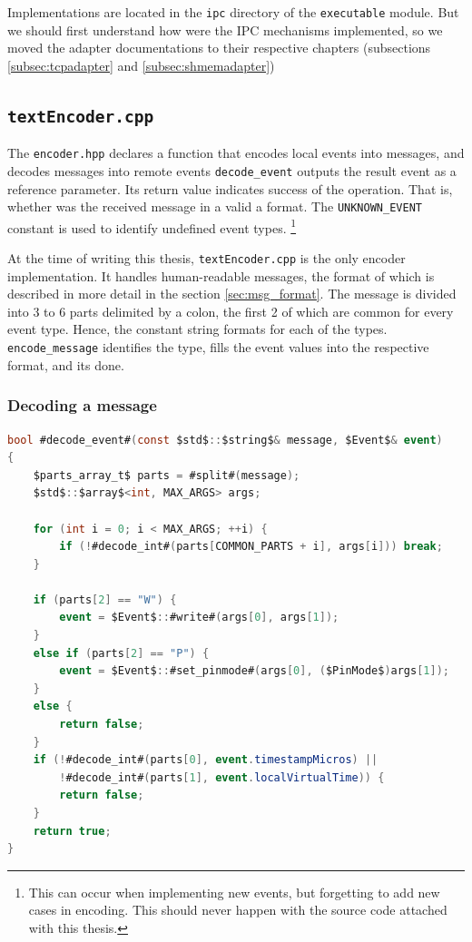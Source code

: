 Implementations are located in the \texttt{ipc} directory of the \texttt{executable} module. But we should first understand how were the IPC mechanisms implemented, so we moved the adapter documentations to their respective chapters (subsections \ref{subsec:tcpadapter} and \ref{subsec:shmemadapter})

\subsection{\texttt{textEncoder.cpp}}

The \texttt{encoder.hpp} declares a function that encodes local events into messages, and decodes messages into remote events \texttt{decode\_event} outputs the result event as a reference parameter. Its return value indicates success of the operation. That is, whether was the received message in a valid a format. The \texttt{UNKNOWN\_EVENT} constant is used to identify undefined event types.
\footnote{This can occur when implementing new events, but forgetting to add new cases in encoding. This should never happen with the source code attached with this thesis.}


At the time of writing this thesis, \texttt{textEncoder.cpp} is the only encoder implementation. It handles human-readable messages, the format of which is described in more detail in the section \ref{sec:msg_format}. The message is divided into 3 to 6 parts delimited by a colon, the first 2 of which are common for every event type. Hence, the constant string formats for each of the types. \texttt{encode\_message} identifies the type, fills the event values into the respective format, and its done.

\subsubsection{Decoding a message}

\begin{lstlisting}[language=csharp, caption={\texttt{decode\_event} implementation}]
bool #decode_event#(const $std$::$string$& message, $Event$& event)
{
    $parts_array_t$ parts = #split#(message);
    $std$::$array$<int, MAX_ARGS> args;

    for (int i = 0; i < MAX_ARGS; ++i) {
        if (!#decode_int#(parts[COMMON_PARTS + i], args[i])) break;
    }

    if (parts[2] == "W") {
        event = $Event$::#write#(args[0], args[1]);
    }
    else if (parts[2] == "P") {
        event = $Event$::#set_pinmode#(args[0], ($PinMode$)args[1]);
    }
    else {
        return false;
    }
    if (!#decode_int#(parts[0], event.timestampMicros) || 
        !#decode_int#(parts[1], event.localVirtualTime)) {
        return false;
    }
    return true;
}
\end{lstlisting}

